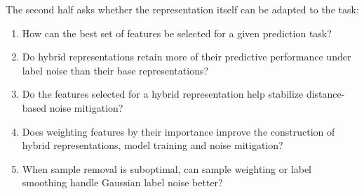 The second half asks whether the representation itself can be adapted to the task:\label{sec:intro:hybrid_questions}
\begin{enumerate}
    \item How can the best set of features be selected for a given prediction task?
    \item Do hybrid representations retain more of their predictive performance under label noise than their base representations?
    \item Do the features selected for a hybrid representation help stabilize distance-based noise mitigation?
    \item Does weighting features by their importance improve the construction of hybrid representations, model training and noise mitigation?
    \item When sample removal is suboptimal, can sample weighting or label smoothing handle Gaussian label noise better?
\end{enumerate}


